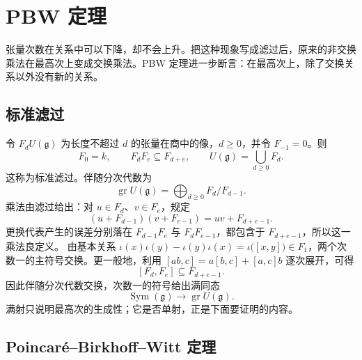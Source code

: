 
\section{PBW 定理}
\label{b5:sec:1502}


%
%

张量次数在关系中可以下降，却不会上升。把这种现象写成滤过后，原来的非交换乘法在最高次上变成交换乘法。PBW 定理进一步断言：在最高次上，除了交换关系以外没有新的关系。

\subsection{标准滤过}
\label{b5:subsec:1502:01}

令 \(F_dU(\mathfrak g)\) 为长度不超过 \(d\) 的张量在商中的像，\(d\ge0\)，并令 \(F_{-1}=0\)。则
\[
	F_0=k,\qquad F_dF_e\subseteq F_{d+e},\qquad U(\mathfrak g)=\bigcup_{d\ge0}F_d.
\]
这称为标准滤过。伴随分次代数为
\[
	\operatorname{gr}U(\mathfrak g) =\bigoplus_{d\ge0}F_d/F_{d-1}.
\]
乘法由滤过给出：对 \(u\in F_d\)、\(v\in F_e\)，规定
\[
	(u+F_{d-1})(v+F_{e-1})=uv+F_{d+e-1}.
\]
更换代表产生的误差分别落在 \(F_{d-1}F_e\) 与 \(F_dF_{e-1}\)，都包含于 \(F_{d+e-1}\)，所以这一乘法良定义。 由基本关系 \(\iota(x)\iota(y)-\iota(y)\iota(x)=\iota\bigl([x,y]\bigr)\in F_1\)，两个次数一的主符号交换。更一般地，利用 \([ab,c]=a[b,c]+[a,c]b\) 逐次展开，可得
\[
	[F_d,F_e]\subseteq F_{d+e-1}.
\]
因此伴随分次代数交换，次数一的符号给出满同态
\[
	\operatorname{Sym}(\mathfrak g)\longrightarrow\operatorname{gr}U(\mathfrak g).
\]
满射只说明最高次的生成性；它是否单射，正是下面要证明的内容。

\subsection{Poincaré–Birkhoff–Witt 定理}
\label{b5:subsec:1502:02}

